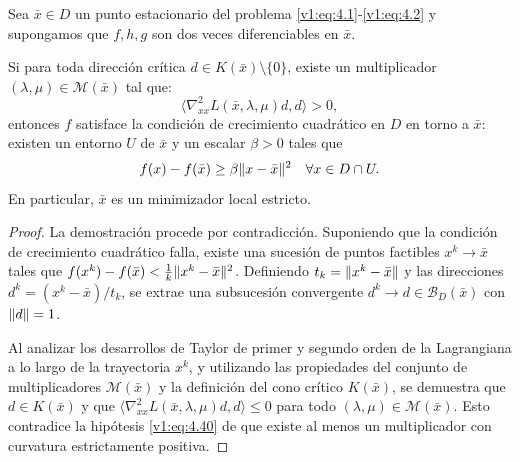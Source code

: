 \begin{theorem}\label{v1:thm:4.3.4}
 Sea $\bar{x} \in D$ un punto estacionario del problema \eqref{v1:eq:4.1}-\eqref{v1:eq:4.2} y supongamos que $f, h, g$ son dos veces diferenciables en $\bar{x}$.
 
 Si para toda dirección crítica $d \in K(\bar{x}) \setminus \{0\}$, existe un multiplicador $(\lambda, \mu) \in \mathcal{M}(\bar{x})$ tal que:
 \begin{equation}
 \langle \nabla_{xx}^2 L(\bar{x}, \lambda, \mu)d, d \rangle > 0,
 \label{v1:eq:4.40}
 \end{equation}
 entonces $f$ satisface la condición de crecimiento cuadrático en $D$ en torno a $\bar{x}$: existen un entorno $U$ de $\bar{x}$ y un escalar $\beta > 0$ tales que
 \begin{equation}
 f(x) - f(\bar{x}) \ge \beta \lVert x - \bar{x}\rVert^2 \quad \forall x \in D \cap U.
 \label{v1:eq:4.41}
 \end{equation}
 En particular, $\bar{x}$ es un minimizador local estricto.
\end{theorem}

\begin{proof}
 La demostración procede por contradicción. Suponiendo que la condición de crecimiento cuadrático falla, existe una sucesión de puntos factibles $x^k \to \bar{x}$ tales que $f(x^k) - f(\bar{x}) < \frac{1}{k} \lVert x^k - \bar{x}\rVert^2$. Definiendo $t_k = \lVert x^k - \bar{x}\rVert$ y las direcciones $d^k = (x^k - \bar{x})/t_k$, se extrae una subsucesión convergente $d^k \to d \in \mathcal{B}_D(\bar{x})$ con $\lVert d\rVert = 1$.
 
 Al analizar los desarrollos de Taylor de primer y segundo orden de la Lagrangiana a lo largo de la trayectoria $x^k$, y utilizando las propiedades del conjunto de multiplicadores $\mathcal{M}(\bar{x})$ y la definición del cono crítico $K(\bar{x})$, se demuestra que $d \in K(\bar{x})$ y que $\langle \nabla_{xx}^2 L(\bar{x}, \lambda, \mu)d, d \rangle \le 0$ para todo $(\lambda, \mu) \in \mathcal{M}(\bar{x})$. Esto contradice la hipótesis \eqref{v1:eq:4.40} de que existe al menos un multiplicador con curvatura estrictamente positiva.
\end{proof}